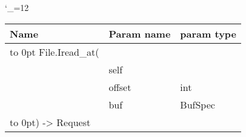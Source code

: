 \begingroup \catcode`\_=12 \tt
\begin{tabular}{lll}
\toprule
\textrm{Name}&\textrm{Param name}&\textrm{param type}\\
\midrule
\hbox to 0pt {File.Iread_at(\hss}\\
& self\\
& offset & int\\
& buf & BufSpec\\
\hbox to 0pt{) -> Request\hss}\\
\bottomrule
\end{tabular}
\endgroup
